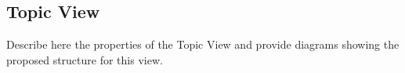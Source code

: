 \subsection{Topic View}

Describe here the properties of the Topic View and provide diagrams showing the proposed structure for this view.